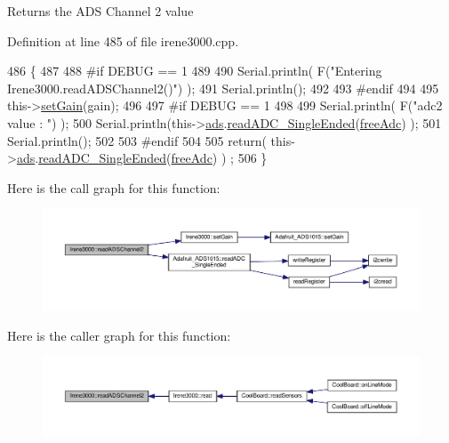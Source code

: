 \begin{DoxyReturn}{Returns}
the A\+DS Channel 2 value 
\end{DoxyReturn}


Definition at line 485 of file irene3000.\+cpp.


\begin{DoxyCode}
486 \{   
487 
488 \textcolor{preprocessor}{#if DEBUG == 1 }
489     
490     Serial.println( F(\textcolor{stringliteral}{"Entering Irene3000.readADSChannel2()"}) );
491     Serial.println();
492 
493 \textcolor{preprocessor}{#endif}
494 
495     this->\hyperlink{class_irene3000_aff7c5da186b388e7272e63ff88a20c34}{setGain}(gain);
496 
497 \textcolor{preprocessor}{#if DEBUG == 1 }
498     
499     Serial.println( F(\textcolor{stringliteral}{"adc2 value : "}) );
500     Serial.println(this->\hyperlink{class_irene3000_a1215e77ba761c9908d80d691f149e135}{ads}.\hyperlink{class_adafruit___a_d_s1015_a40f38b9e1f3ec397c0670dd632510235}{readADC\_SingleEnded}(\hyperlink{_irene3000_8h_a55497513af255250e464ed76543d46d7}{freeAdc}) );
501     Serial.println();
502 
503 \textcolor{preprocessor}{#endif}
504 
505     \textcolor{keywordflow}{return}( this->\hyperlink{class_irene3000_a1215e77ba761c9908d80d691f149e135}{ads}.\hyperlink{class_adafruit___a_d_s1015_a40f38b9e1f3ec397c0670dd632510235}{readADC\_SingleEnded}(\hyperlink{_irene3000_8h_a55497513af255250e464ed76543d46d7}{freeAdc}) ) ;
506 \}
\end{DoxyCode}
Here is the call graph for this function\+:\nopagebreak
\begin{figure}[H]
\begin{center}
\leavevmode
\includegraphics[width=350pt]{d6/d03/class_irene3000_ae73bd2ed14a199a7e83f4d6458476a7c_cgraph}
\end{center}
\end{figure}
Here is the caller graph for this function\+:\nopagebreak
\begin{figure}[H]
\begin{center}
\leavevmode
\includegraphics[width=350pt]{d6/d03/class_irene3000_ae73bd2ed14a199a7e83f4d6458476a7c_icgraph}
\end{center}
\end{figure}
\mbox{\label{class_irene3000_a78a87eb7cf295b95c12b2ebd51c2bb77}} 

